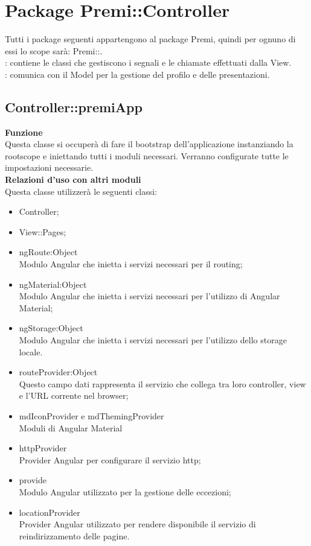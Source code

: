 \section{Package Premi::\-Controller}{
	\label{sec:controller}
	Tutti i package seguenti appartengono al package Premi, quindi per ognuno di essi lo scope sarà: Premi::.\\
	\textbf{\tipo}: contiene le classi che gestiscono i segnali e le chiamate effettuati dalla View.\\
	\textbf{\relaz}: comunica con il Model per la gestione del profilo e delle presentazioni.\\

	\subsection{Controller::\-premiApp}{
		\label{sec:premiapp}
		\textbf{Funzione}\\
		\indent Questa classe si occuperà di fare il bootstrap dell'applicazione instanziando la rootscope  e iniettando tutti i moduli necessari. Verranno configurate tutte le impostazioni necessarie.\\
		\textbf{Relazioni d'uso con altri moduli}\\
		\indent Questa classe utilizzerà le seguenti classi:
		\begin{itemize}
			\item Controller;
			\item View::Pages;
			\item ngRoute:Object\\
				\indent Modulo Angular che inietta i servizi necessari per il routing;
			\item ngMaterial:Object\\
				\indent Modulo Angular che inietta i servizi necessari per l'utilizzo di Angular Material;
			\item ngStorage:Object\\
				\indent Modulo Angular che inietta i servizi necessari per l'utilizzo dello storage locale.
			\item \textdollar routeProvider:Object\\
				\indent Questo campo dati rappresenta il servizio che collega tra loro controller, view e l'URL corrente nel browser;
			\item \textdollar mdIconProvider e \textdollar mdThemingProvider\\
				\indent Moduli di Angular Material
			\item \textdollar httpProvider\\
				\indent Provider Angular per configurare il servizio http;
			\item \textdollar provide\\
				\indent Modulo Angular utilizzato per la gestione delle eccezioni;
			\item \textdollar locationProvider\\
				\indent Provider Angular utilizzato per rendere disponibile il servizio di reindirizzamento delle pagine.
		\end{itemize}
	}

}
